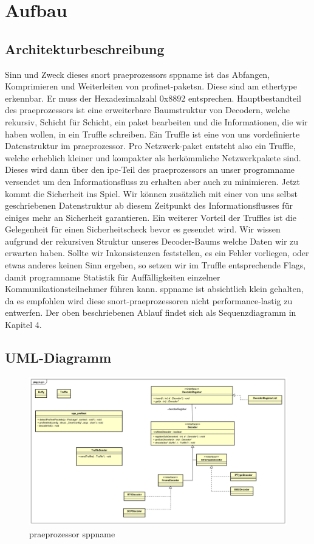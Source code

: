 \chapter{Aufbau \sppname}

\section{Architekturbeschreibung}

Sinn und Zweck dieses \gls{snort} \gls{praeprozessor}s \gls{sppname} ist das Abfangen,
Komprimieren und Weiterleiten von \gls{profinet}-\glspl{paket}n. Diese
sind am \gls{ethertype} erkennbar. Er muss der Hexadezimalzahl 0x8892 entsprechen.
Hauptbestandteil des \gls{praeprozessor}s ist eine erweiterbare Baumstruktur von Decodern, welche rekursiv, Schicht für Schicht, ein \gls{paket} bearbeiten und die Informationen, die wir haben wollen, in ein Truffle schreiben. Ein Truffle ist eine von uns vordefinierte Datenstruktur im \gls{praeprozessor}.
Pro Netzwerk-\gls{paket} entsteht also ein Truffle, welche erheblich kleiner und kompakter als herkömmliche Netzwerkpakete sind. Dieses wird dann über den \gls{ipc}-Teil des \gls{praeprozessor}s
an unser \gls{programname} versendet um den Informationsfluss zu erhalten aber auch zu minimieren.\newline
Jetzt kommt die Sicherheit ins Spiel. Wir können zusätzlich mit einer von uns selbst geschriebenen Datenstruktur ab diesem Zeitpunkt des Informationsflusses für einiges mehr an Sicherheit garantieren.
Ein weiterer Vorteil der Truffles ist die Gelegenheit für einen Sicherheitscheck bevor es gesendet wird. Wir wissen aufgrund der rekursiven Struktur unseres Decoder-Baums welche Daten wir zu erwarten haben. Sollte wir Inkonsistenzen feststellen, es ein Fehler vorliegen, oder etwas anderes keinen Sinn ergeben, so setzen wir im Truffle entsprechende Flags, damit \gls{programname} Statistik für Auffälligkeiten einzelner Kommunikationsteilnehmer führen kann.\newline
\gls{sppname} ist absichtlich klein gehalten, da es empfohlen wird diese \gls{snort}-\gls{praeprozessor}en nicht performance-lastig zu entwerfen. Der oben beschriebenen Ablauf findet sich als Sequenzdiagramm in Kapitel 4.


\section{UML-Diagramm}

\begin{figure}
  \centering
  \includegraphics[width=\paperwidth]{../diagramimages/spp_profinet.png}
  \caption{\gls{praeprozessor} \gls{sppname}}
\end{figure}
